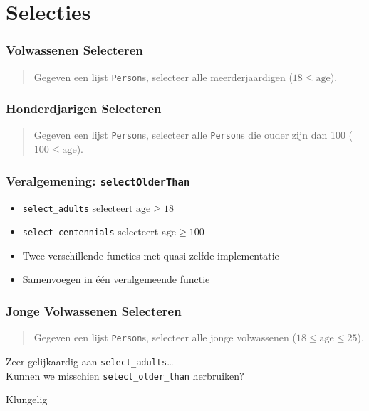\section{Selecties}

\frame{\tableofcontents[currentsection]}

\begin{frame}
  \frametitle{Volwassenen Selecteren}
  \begin{quote}
    Gegeven een lijst \texttt{Person}s, selecteer
    alle meerderjaardigen ($18 \leq \mathrm{age}$).
  \end{quote}
\end{frame}

\begin{frame}
  \frametitle{Honderdjarigen Selecteren}
  \begin{quote}
    Gegeven een lijst \texttt{Person}s, selecteer
    alle \texttt{Person}s die ouder zijn dan 100 ($100 \leq \mathrm{age}$).
  \end{quote}
\end{frame}

\begin{frame}
  \frametitle{Veralgemening: \texttt{selectOlderThan}}
  \begin{itemize}
    \item \texttt{select\_adults} selecteert $\mathrm{age} \geq 18$
    \item \texttt{select\_centennials} selecteert $\mathrm{age} \geq 100$
    \item Twee verschillende functies met quasi zelfde implementatie
    \item Samenvoegen in \'e\'en veralgemeende functie
  \end{itemize}
\end{frame}

\begin{frame}
  \frametitle{Jonge Volwassenen Selecteren}
  \begin{quote}
    Gegeven een lijst \texttt{Person}s, selecteer
    alle jonge volwassenen ($18 \leq \mathrm{age} \leq 25$).
  \end{quote}
  \vskip5mm
  \begin{overprint}

  \end{overprint}
  \vskip5mm
  \begin{overprint}
    \begin{center}
      Zeer gelijkaardig aan \texttt{select\_adults}\dots \\
      Kunnen we misschien \texttt{select\_older\_than} herbruiken?
    \end{center}

    \begin{center}
      Klungelig
    \end{center}
  \end{overprint}
\end{frame}

